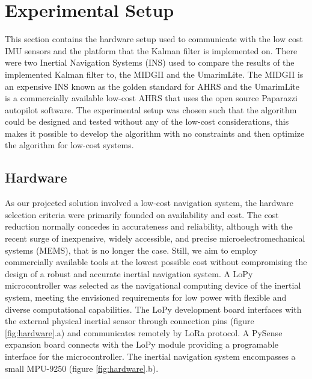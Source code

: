 \section{Experimental Setup}

This section contains the hardware setup used to communicate with the low cost IMU sensors and the platform that the Kalman filter is implemented on. There were two Inertial
Navigation Systems (INS) used to compare the results of the implemented Kalman filter to,
the MIDGII and the UmarimLite. The MIDGII is an expensive INS known as the golden
standard for AHRS and the UmarimLite is a commercially available low-cost AHRS that
uses the open source Paparazzi autopilot software. The experimental setup was chosen such
that the algorithm could be designed and tested without any of the low-cost considerations, this makes it possible to develop the algorithm with no constraints and then optimize the
algorithm for low-cost systems.

\subsection{Hardware}

As our projected solution involved a low-cost navigation system, the hardware selection criteria were primarily founded on availability and cost. The cost reduction normally concedes in accurateness and reliability, although with the recent surge of inexpensive, widely accessible, and precise microelectromechanical systems (MEMS), that is no longer the case. Still, we aim to employ commercially available tools at the lowest possible cost without compromising the design of a robust and accurate inertial navigation system. A LoPy microcontroller was selected as the navigational computing device of the inertial system, meeting the envisioned requirements for low power with flexible and diverse computational capabilities. The LoPy development board interfaces with the external physical inertial sensor through connection pins (figure \ref{fig:hardware}.a) and communicates remotely by LoRa protocol. A PySense expansion board connects with the LoPy module providing a programable interface for the microcontroller. The inertial navigation system encompasses a small MPU-9250 (figure \ref{fig:hardware}.b).

